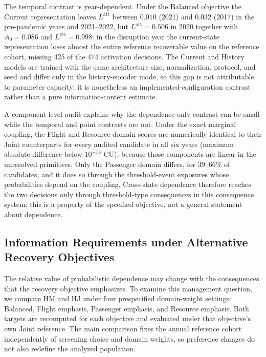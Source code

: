 The temporal contrast is year-dependent. Under the Balanced objective the Current representation leaves $L^{\mathrm{att}}$ between $0.010$ (2021) and $0.032$ (2017) in the pre-pandemic years and 2021--2022, but $L^{\mathrm{att}}=0.506$ in 2020 together with $A_0=0.086$ and $L^{\mathrm{rec}}=0.998$: in the disruption year the current-state representation loses almost the entire reference recoverable value on the reference cohort, missing 425 of the 474 activation decisions. The Current and History models are trained with the same architecture size, normalization, protocol, and seed and differ only in the history-encoder mode, so this gap is not attributable to parameter capacity; it is nonetheless an implemented-configuration contrast rather than a pure information-content estimate.

A component-level audit explains why the dependence-only contrast can be small while the temporal and point contrasts are not. Under the exact marginal coupling, the Flight and Resource domain scores are numerically identical to their Joint counterparts for every audited candidate in all six years (maximum absolute difference below $10^{-13}$ CU), because those components are linear in the unresolved primitives. Only the Passenger domain differs, for 39--66\% of candidates, and it does so through the threshold-event exposures whose probabilities depend on the coupling. Cross-state dependence therefore reaches the two decisions only through threshold-type consequences in this consequence system; this is a property of the specified objective, not a general statement about dependence.

\subsection{Information Requirements under Alternative Recovery Objectives}
\label{subsec:results_objectives}

The relative value of probabilistic dependence may change with the consequences that the recovery objective emphasizes. To examine this management question, we compare HM and HJ under four prespecified domain-weight settings: Balanced, Flight emphasis, Passenger emphasis, and Resource emphasis. Both targets are recomputed for each objective and evaluated under that objective's own Joint reference. The main comparison fixes the annual reference cohort independently of screening choice and domain weights, so preference changes do not also redefine the analyzed population.

